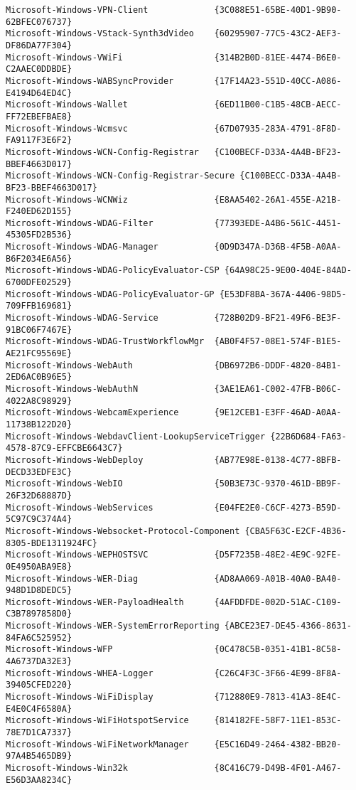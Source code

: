 \documentclass{report}
\begin{document}
\begin{lstlisting}[breaklines=true,basicstyle=\tiny]
Microsoft-Windows-VPN-Client             {3C088E51-65BE-40D1-9B90-62BFEC076737}
Microsoft-Windows-VStack-Synth3dVideo    {60295907-77C5-43C2-AEF3-DF86DA77F304}
Microsoft-Windows-VWiFi                  {314B2B0D-81EE-4474-B6E0-C2AAEC0DDBDE}
Microsoft-Windows-WABSyncProvider        {17F14A23-551D-40CC-A086-E4194D64ED4C}
Microsoft-Windows-Wallet                 {6ED11B00-C1B5-48CB-AECC-FF72EBEFBAE8}
Microsoft-Windows-Wcmsvc                 {67D07935-283A-4791-8F8D-FA9117F3E6F2}
Microsoft-Windows-WCN-Config-Registrar   {C100BECF-D33A-4A4B-BF23-BBEF4663D017}
Microsoft-Windows-WCN-Config-Registrar-Secure {C100BECC-D33A-4A4B-BF23-BBEF4663D017}
Microsoft-Windows-WCNWiz                 {E8AA5402-26A1-455E-A21B-F240ED62D155}
Microsoft-Windows-WDAG-Filter            {77393EDE-A4B6-561C-4451-45305FD2B536}
Microsoft-Windows-WDAG-Manager           {0D9D347A-D36B-4F5B-A0AA-B6F2034E6A56}
Microsoft-Windows-WDAG-PolicyEvaluator-CSP {64A98C25-9E00-404E-84AD-6700DFE02529}
Microsoft-Windows-WDAG-PolicyEvaluator-GP {E53DF8BA-367A-4406-98D5-709FFB169681}
Microsoft-Windows-WDAG-Service           {728B02D9-BF21-49F6-BE3F-91BC06F7467E}
Microsoft-Windows-WDAG-TrustWorkflowMgr  {AB0F4F57-08E1-574F-B1E5-AE21FC95569E}
Microsoft-Windows-WebAuth                {DB6972B6-DDDF-4820-84B1-2ED6AC0B96E5}
Microsoft-Windows-WebAuthN               {3AE1EA61-C002-47FB-B06C-4022A8C98929}
Microsoft-Windows-WebcamExperience       {9E12CEB1-E3FF-46AD-A0AA-11738B122D20}
Microsoft-Windows-WebdavClient-LookupServiceTrigger {22B6D684-FA63-4578-87C9-EFFCBE6643C7}
Microsoft-Windows-WebDeploy              {AB77E98E-0138-4C77-8BFB-DECD33EDFE3C}
Microsoft-Windows-WebIO                  {50B3E73C-9370-461D-BB9F-26F32D68887D}
Microsoft-Windows-WebServices            {E04FE2E0-C6CF-4273-B59D-5C97C9C374A4}
Microsoft-Windows-Websocket-Protocol-Component {CBA5F63C-E2CF-4B36-8305-BDE1311924FC}
Microsoft-Windows-WEPHOSTSVC             {D5F7235B-48E2-4E9C-92FE-0E4950ABA9E8}
Microsoft-Windows-WER-Diag               {AD8AA069-A01B-40A0-BA40-948D1D8DEDC5}
Microsoft-Windows-WER-PayloadHealth      {4AFDDFDE-002D-51AC-C109-C3B7897858D0}
Microsoft-Windows-WER-SystemErrorReporting {ABCE23E7-DE45-4366-8631-84FA6C525952}
Microsoft-Windows-WFP                    {0C478C5B-0351-41B1-8C58-4A6737DA32E3}
Microsoft-Windows-WHEA-Logger            {C26C4F3C-3F66-4E99-8F8A-39405CFED220}
Microsoft-Windows-WiFiDisplay            {712880E9-7813-41A3-8E4C-E4E0C4F6580A}
Microsoft-Windows-WiFiHotspotService     {814182FE-58F7-11E1-853C-78E7D1CA7337}
Microsoft-Windows-WiFiNetworkManager     {E5C16D49-2464-4382-BB20-97A4B5465DB9}
Microsoft-Windows-Win32k                 {8C416C79-D49B-4F01-A467-E56D3AA8234C}

\end{lstlisting}
\end{document}
